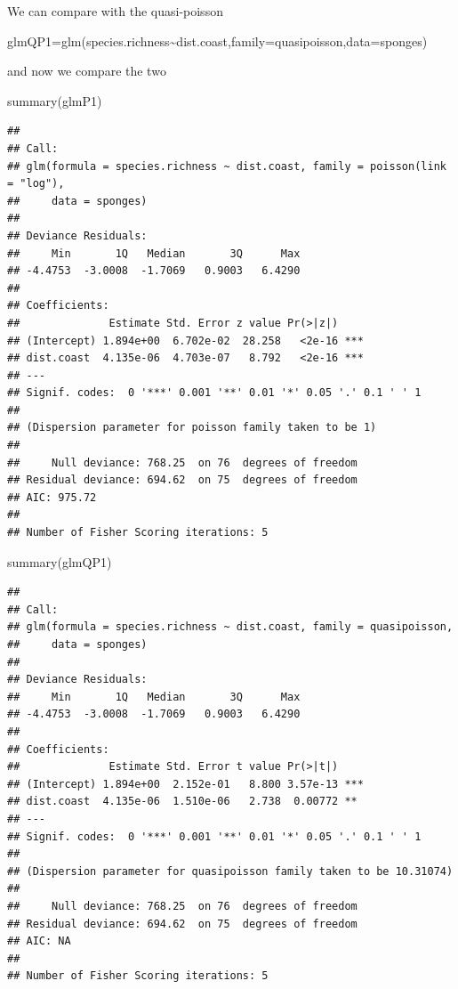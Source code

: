 \documentclass[
]{book}
\newenvironment{Shaded}{\begin{snugshade}}{\end{snugshade}}
\newcommand{\AttributeTok}[1]{\textcolor[rgb]{0.77,0.63,0.00}{#1}}
\newcommand{\FunctionTok}[1]{\textcolor[rgb]{0.00,0.00,0.00}{#1}}
\newcommand{\NormalTok}[1]{#1}
\newcommand{\OtherTok}[1]{\textcolor[rgb]{0.56,0.35,0.01}{#1}}
\newcommand{\SpecialCharTok}[1]{\textcolor[rgb]{0.00,0.00,0.00}{#1}}
\begin{document}
We can compare with the quasi-poisson

\begin{Shaded}
\begin{Highlighting}[]
\NormalTok{glmQP1}\OtherTok{=}\FunctionTok{glm}\NormalTok{(species.richness}\SpecialCharTok{\textasciitilde{}}\NormalTok{dist.coast,}\AttributeTok{family=}\NormalTok{quasipoisson,}\AttributeTok{data=}\NormalTok{sponges)}
\end{Highlighting}
\end{Shaded}

and now we compare the two

\begin{Shaded}
\begin{Highlighting}[]
\FunctionTok{summary}\NormalTok{(glmP1)}
\end{Highlighting}
\end{Shaded}

\begin{verbatim}
## 
## Call:
## glm(formula = species.richness ~ dist.coast, family = poisson(link = "log"), 
##     data = sponges)
## 
## Deviance Residuals: 
##     Min       1Q   Median       3Q      Max  
## -4.4753  -3.0008  -1.7069   0.9003   6.4290  
## 
## Coefficients:
##              Estimate Std. Error z value Pr(>|z|)    
## (Intercept) 1.894e+00  6.702e-02  28.258   <2e-16 ***
## dist.coast  4.135e-06  4.703e-07   8.792   <2e-16 ***
## ---
## Signif. codes:  0 '***' 0.001 '**' 0.01 '*' 0.05 '.' 0.1 ' ' 1
## 
## (Dispersion parameter for poisson family taken to be 1)
## 
##     Null deviance: 768.25  on 76  degrees of freedom
## Residual deviance: 694.62  on 75  degrees of freedom
## AIC: 975.72
## 
## Number of Fisher Scoring iterations: 5
\end{verbatim}

\begin{Shaded}
\begin{Highlighting}[]
\FunctionTok{summary}\NormalTok{(glmQP1)}
\end{Highlighting}
\end{Shaded}

\begin{verbatim}
## 
## Call:
## glm(formula = species.richness ~ dist.coast, family = quasipoisson, 
##     data = sponges)
## 
## Deviance Residuals: 
##     Min       1Q   Median       3Q      Max  
## -4.4753  -3.0008  -1.7069   0.9003   6.4290  
## 
## Coefficients:
##              Estimate Std. Error t value Pr(>|t|)    
## (Intercept) 1.894e+00  2.152e-01   8.800 3.57e-13 ***
## dist.coast  4.135e-06  1.510e-06   2.738  0.00772 ** 
## ---
## Signif. codes:  0 '***' 0.001 '**' 0.01 '*' 0.05 '.' 0.1 ' ' 1
## 
## (Dispersion parameter for quasipoisson family taken to be 10.31074)
## 
##     Null deviance: 768.25  on 76  degrees of freedom
## Residual deviance: 694.62  on 75  degrees of freedom
## AIC: NA
## 
## Number of Fisher Scoring iterations: 5
\end{verbatim}
\end{document}
